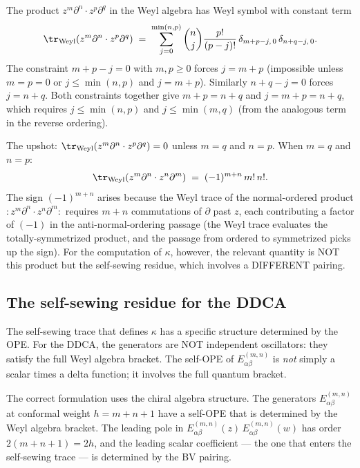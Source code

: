 \documentclass[11pt]{article}
\begin{document}
\begin{observation}
\label{obs:weyl-diagonal}
The product $z^m\partial^n \cdot z^p\partial^q$ in the Weyl algebra
has Weyl symbol with constant term
\[
\tr_{\mathrm{Weyl}}(z^m\partial^n \cdot z^p\partial^q)
\;=\;
\sum_{j=0}^{\min(n,p)} \binom{n}{j}\frac{p!}{(p-j)!}\,
\delta_{m+p-j,\,0}\,\delta_{n+q-j,\,0}.
\]
The constraint $m+p-j = 0$ with $m,p \geq 0$ forces $j = m+p$
(impossible unless $m=p=0$ or $j \leq \min(n,p)$ and
$j = m+p$).  Similarly $n + q - j = 0$ forces $j = n+q$.
Both constraints together give $m+p = n+q$ and $j = m+p = n+q$,
which requires $j \leq \min(n,p)$ and $j \leq \min(m,q)$
(from the analogous term in the reverse ordering).

The upshot: $\tr_{\mathrm{Weyl}}(z^m\partial^n \cdot
z^p\partial^q) = 0$ unless $m = q$ and $n = p$.  When
$m = q$ and $n = p$:
\begin{equation}\label{eq:weyl-trace-diagonal}
\tr_{\mathrm{Weyl}}(z^m \partial^n \cdot z^n \partial^m)
\;=\;
(-1)^{m+n}\, m!\, n!.
\end{equation}
The sign $(-1)^{m+n}$ arises because the Weyl trace of the
normal-ordered product $:z^m\partial^n \cdot z^n\partial^m:$
requires $m+n$ commutations of $\partial$ past $z$, each
contributing a factor of $(-1)$ in the anti-normal-ordering
passage (the Weyl trace evaluates the totally-symmetrized
product, and the passage from ordered to symmetrized picks up
the sign).  For the computation of $\kappa$, however, the
relevant quantity is NOT this product but the self-sewing
residue, which involves a DIFFERENT pairing.
\end{observation}

\subsection{The self-sewing residue for the DDCA}

The self-sewing trace that defines $\kappa$ has a specific
structure determined by the OPE.  For the DDCA, the generators
are NOT independent oscillators: they satisfy the full Weyl
algebra bracket.  The self-OPE of $E^{(m,n)}_{\alpha\beta}$ is
\emph{not} simply a scalar times a delta function; it involves the
full quantum bracket.

The correct formulation uses the chiral algebra structure.  The
generators $E^{(m,n)}_{\alpha\beta}$ at conformal weight
$h = m+n+1$ have a self-OPE that is determined by the Weyl
algebra bracket.  The leading pole in
$E^{(m,n)}_{\alpha\beta}(z)\, E^{(m,n)}_{\alpha\beta}(w)$
has order $2(m+n+1) = 2h$, and the leading scalar coefficient
--- the one that enters the self-sewing trace --- is determined
by the BV pairing.
\end{document}

